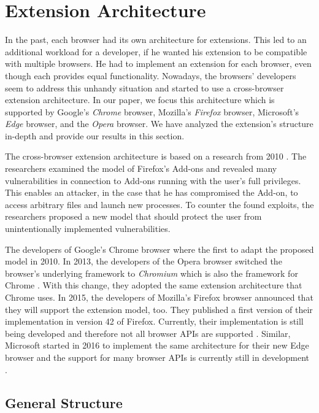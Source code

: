 \newpage
\section{Extension Architecture}
\label{sec:extensionArchitecture}

	In the past, each browser had its own architecture for extensions. This led to an additional workload for a developer, if he wanted his extension to be compatible with multiple browsers. He had to implement an extension for each browser, even though each provides equal functionality. Nowadays, the browsers' developers seem to address this unhandy situation and started to use a cross-browser extension architecture. In our paper, we focus this architecture which is supported by Google's \textit{Chrome} browser, Mozilla's \textit{Firefox} browser, Microsoft's \textit{Edge} browser, and the \textit{Opera} browser. We have analyzed the extension's structure in-depth and provide our results in this section.

	The cross-browser extension architecture is based on a research from 2010 \cite{Barth10protectingbrowsers}. The researchers examined the model of Firefox's Add-ons and revealed many vulnerabilities in connection to Add-ons running with the user's full privileges. This enables an attacker, in the case that he has compromised the Add-on, to access arbitrary files and launch new processes. To counter the found exploits, the researchers proposed a new model that should protect the user from unintentionally implemented vulnerabilities.

	The developers of Google's Chrome browser where the first to adapt the proposed model in 2010. In 2013, the developers of the Opera browser switched the browser's underlying framework to \textit{Chromium} which is also the framework for Chrome \cite{operaBlogSwitchToChromium}. With this change, they adopted the same extension architecture that Chrome uses. In 2015, the developers of Mozilla's Firefox browser announced that they will support the extension model, too. They published a first version of their implementation in version 42 of Firefox. Currently, their implementation is still being developed and therefore not all browser APIs are supported \cite{mozillaWebExtensionStatus}. Similar, Microsoft started in 2016 to implement the same architecture for their new Edge browser and the support for many browser APIs is currently still in development \cite{edgeBrowserApiStatus}.

\subsection{General Structure}

